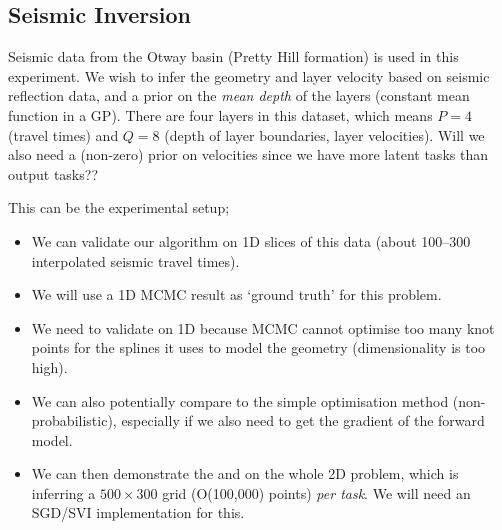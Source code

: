 \subsection{Seismic Inversion}

Seismic data from the Otway basin (Pretty Hill formation) is used in this
experiment. We wish to infer the geometry and layer velocity based on seismic
reflection data, and a prior on the \emph{mean depth} of the layers (constant
mean function in a GP). There are four layers in this dataset, which means $P =
4$ (travel times) and $Q = 8$ (depth of layer boundaries, layer velocities).
Will we also need a (non-zero) prior on velocities since we have more latent
tasks than output tasks??

This can be the experimental setup;
\begin{itemize}
    \item We can validate our algorithm on 1D slices of this data (about
        100--300 interpolated seismic travel times).
    \item We will use a 1D MCMC result as `ground truth' for this problem.
    \item We need to validate on 1D because MCMC cannot optimise too many knot
        points for the splines it uses to model the geometry (dimensionality is
        too high).
    \item We can also potentially compare to the simple optimisation method
        (non-probabilistic), especially if we also need to get the gradient of
        the forward model.
    \item We can then demonstrate the \eks and \uks on the whole 2D problem,
        which is inferring a $500\times300$ grid (O(100,000) points) \emph{per
            task}. We will need an SGD/SVI implementation for this.
\end{itemize}


